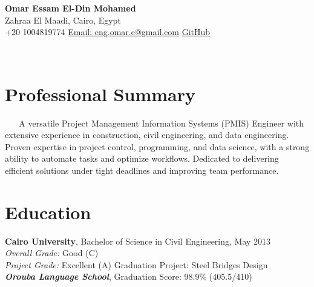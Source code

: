 \documentclass[10pt, letterpaper]{article}
\begin{document}
\begin{center}
    {\LARGE \textbf{Omar Essam El-Din Mohamed}} \\
    {Zahraa El Maadi, Cairo, Egypt} \\
    {\faPhone* \hspace{0.2cm} +20 1004819774} \hspace{1cm}
    {\href{mailto:eng.omar.e@gmail.com}{\faEnvelope[regular] \hspace{0.2cm} Email: eng.omar.e@gmail.com}} \hspace{1cm}
    {\href{https://github.com/omare32}{\faGithub \hspace{0.2cm} GitHub}}
\end{center}
    
    \section{Professional Summary}
    A versatile Project Management Information Systems (PMIS) Engineer with extensive experience in construction, civil engineering, and data engineering. Proven expertise in project control, programming, and data science, with a strong ability to automate tasks and optimize workflows. Dedicated to delivering efficient solutions under tight deadlines and improving team performance.

\section{Education}
\textbf{Cairo University}, Bachelor of Science in Civil Engineering, May 2013 \\
\textit{Overall Grade:} Good (C) \\
\textit{Project Grade:} Excellent (A) {Graduation Project:} Steel Bridges Design \\
\textit

\textbf{Orouba Language School}, Graduation Score: 98.9\% (405.5/410)
\end{document}
